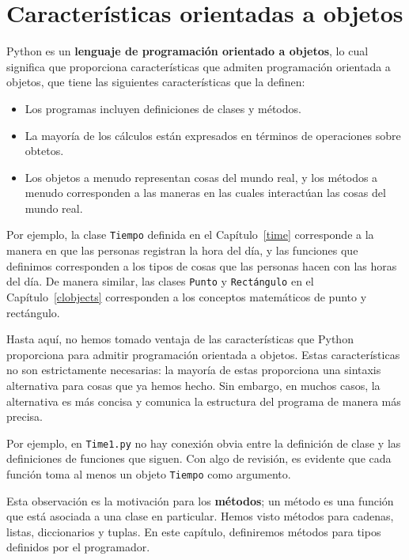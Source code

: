\documentclass[10pt]{book}
\begin{document}
\section{Características orientadas a objetos}

Python es un {\bf lenguaje de programación orientado a objetos}, lo cual significa
que proporciona características que admiten programación
orientada a objetos, que tiene las siguientes características que la definen:

\begin{itemize}

\item Los programas incluyen definiciones de clases y métodos.

\item La mayoría de los cálculos están expresados en términos de operaciones sobre
  obtetos.

\item Los objetos a menudo representan cosas
del mundo real, y los métodos a menudo
corresponden a las maneras en las cuales interactúan las cosas del mundo real.

\end{itemize}

Por ejemplo, la clase {\tt Tiempo} definida en el Capítulo~\ref{time}
corresponde a la manera en que las personas registran la hora del día, y las
funciones que definimos corresponden a los tipos de cosas que las personas hacen con
las horas del día.  De manera similar, las clases {\tt Punto} y {\tt Rectángulo}
en el Capítulo~\ref{clobjects}
corresponden a los conceptos matemáticos de punto y rectángulo.

Hasta aquí, no hemos tomado ventaja de las características que Python proporciona para
admitir programación orientada a objetos.  Estas características
no son estrictamente necesarias: la mayoría de estas proporciona
una sintaxis alternativa para cosas que ya hemos hecho.  Sin embargo, en muchos casos,
la alternativa es más concisa y comunica la estructura del programa
de manera más precisa.

Por ejemplo, en {\tt Time1.py} no hay conexión
obvia entre la definición de clase y las definiciones de funciones
que siguen.  Con algo de revisión, es evidente que cada función
toma al menos un objeto {\tt Tiempo} como argumento.

Esta observación es la motivación para los {\bf métodos}; un método es
una función que está asociada a una clase en particular.
Hemos visto métodos para cadenas, listas, diccionarios y tuplas.
En este capítulo, definiremos métodos para tipos definidos por el programador.
\end{document}
